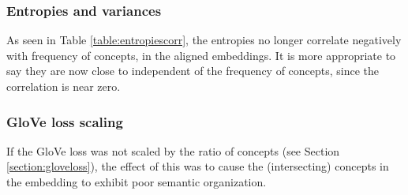 \subsubsection{Entropies and variances}

As seen in Table \ref{table:entropiescorr}, the entropies no longer correlate negatively with frequency of concepts, in the aligned embeddings. It is more appropriate to say they are now close to independent of the frequency of concepts, since the correlation is near zero. 

\subsubsection{GloVe loss scaling}
If the GloVe loss was not scaled by the ratio of concepts (see Section \ref{section:gloveloss}), the effect of this was to cause the (intersecting) concepts in the embedding to exhibit poor semantic organization.



